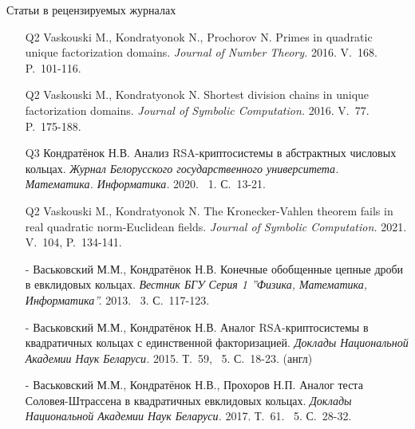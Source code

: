 \documentclass[8pt, xcolor=x11names]{beamer}
\begin{document}
\begin{frame}{Статьи в рецензируемых журналах}
    \begin{enumerate}
        \item[Q2] Vaskouski M., Kondratyonok N., Prochorov N. Primes in quadratic unique factorization domains. {\it Journal of Number Theory.} 2016. V.~168. P.~101-116.
        
        \item[Q2] Vaskouski M., Kondratyonok N. Shortest division chains in unique factorization domains. {\it Journal of Symbolic Computation.} 2016. V.~77. P.~175-188.
        
        \item[Q3] Кондратёнок Н.В. Анализ RSA-криптосистемы в абстрактных числовых кольцах. {\it Журнал Белорусского государственного университета. Математика. Информатика.} 2020. \textnumero~1. С.~13-21.

        \item[Q2] Vaskouski M., Kondratyonok N. The Kronecker-Vahlen theorem fails in real quadratic norm-Euclidean fields. {\it Journal of Symbolic Computation.} 2021. V.~104, P.~134-141.

        \item[-] Васьковский М.М., Кондратёнок Н.В. Конечные обобщенные цепные дроби в евклидовых кольцах. {\it Вестник БГУ Серия 1 ''Физика, Математика, Информатика''.} 2013. \textnumero~3. С.~117-123.
        
        \item[-] Васьковский М.М., Кондратёнок Н.В. Аналог RSA-криптосистемы в квадратичных кольцах с единственной факторизацией. {\it Доклады Национальной Академии Наук Беларуси.} 2015. Т.~59, \textnumero~5. С.~18-23. (англ)

        \item[-] Васьковский М.М., Кондратёнок Н.В., Прохоров Н.П. Аналог теста Соловея-Штрассена в квадратичных евклидовых кольцах. {\it Доклады Национальной Академии Наук Беларуси.} 2017. Т.~61. \textnumero~5. С.~28-32.
    \end{enumerate}
\end{frame}
\end{document}
